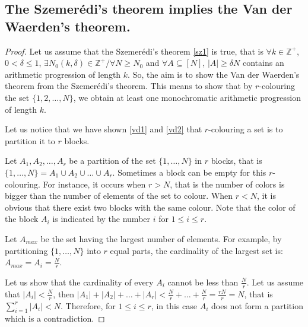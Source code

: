 \subsection{The Szemerédi's theorem implies the Van der Waerden's theorem.} \label{vsz}

\begin{proof}
  Let us assume that the Szemerédi's theorem \eqref{sz1} is true, that is $\forall k \in \mathbb{Z}^+$, $0< \delta \leq  1$, $\exists N_0(k,\delta) \in \mathbb{Z}^+/ \forall N \geq N_0$ and $ \forall A \subseteq [N]$, $|A|\geq \delta N$ contains an arithmetic progression of length $k.$ So, the aim is to show the  Van der Waerden's theorem from the Szemerédi's theorem. This means to  show that by $r$-colouring the set $\{1,2,\ldots, N\}$, we obtain at least one monochromatic arithmetic progression of length $k.$
  
   Let us notice that we have shown \eqref{vd1} and \eqref{vd2} that $r$-colouring a set  is to partition it to $r$ blocks.

   Let $A_1,A_2, \ldots, A_r$ be a partition of the set $\{1, \ldots, N\}$ in $r$ blocks, that is $ \{1, \ldots, N\} =A_1 \cup A_2 \cup \ldots \cup A_r$. Sometimes a block can be empty for this $r$-colouring. For instance, it occurs when $r >N$, that is the number of colors is bigger than the number of elements of the set to colour. When $r <N$, it is obvious that there exist two blocks with the same colour. Note that the color of the block $A_i$ is indicated  by the number $i$  for $1\leq i \leq r.$ 

Let $A_{max}$ be the set having the largest number of elements. For example, by partitioning $\{1, \ldots, N\}$ into $r$ equal parts, the cardinality of the largest set is: $A_{max}=A_i=\frac{N}{r}$.

  Let us show that the cardinality of every $A_i$  cannot be less than $\frac{N}{r}$.
  Let us assume that  $|A_i| < \frac{N}{r}$,  then $|A_1|+|A_2|+ \ldots +|A_r| < \frac{N}{r}+\ldots +\frac{N}{r}=\frac{rN}{r}=N$,
 that is $\displaystyle{ \sum_{i=1}^{r}|A_i|<N}$. Therefore, for $1\leq i \leq r$, in this case $A_i$ does not form a partition which is a contradiction.


\end{proof}
